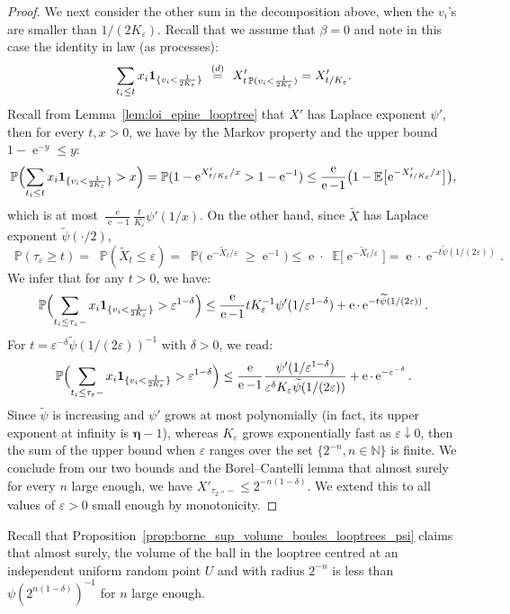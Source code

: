 \documentclass[british, a4paper,11pt]{article}
\numberwithin{equation}{section}
\theoremstyle{definition}
\renewcommand{\P}{\mathop{}\!\mathbb{P}}
\newcommand{\E}{\mathop{}\!\mathbb{E}}
\newcommand{\N}{\mathbb{N}}
\newcommand{\e}{\operatorname{e}}
\newcommand{\bdeta}{\boldsymbol{\eta}}
\newcommand{\ind}[1]{\mathbf{1}_{\{#1\}}}
\newcommand{\eqloi}[1][n]{\enskip\mathop{=}^{(d)}_{}\enskip}
\begin{document}
\begin{proof}
We next consider the other sum in the decomposition above, when the $v_{i}$'s are smaller than $1/(2K_\varepsilon)$.
Recall that we assume that $\beta=0$ and note in this case the identity in law (as processes):
\[\sum_{t_{i} \leq t} x_{i} \ind{v_{i} < \frac{1}{2 K_\varepsilon}} \eqloi X'_{t \P(v_{i} < \frac{1}{2K_\varepsilon})} = X'_{t / K_\varepsilon}.\]
Recall from Lemma~\ref{lem:loi_epine_looptree} that $X'$ has Laplace exponent $\psi'$, then for every $t,x> 0$,
we have by the Markov property and the upper bound $1-\e^{-y} \leq y$:
\[\P\Bigl(\sum_{t_{i} \leq t} x_{i} \ind{v_{i} < \frac{1}{2K_\varepsilon}} > x\Bigr)
= \P(1 - \e^{X'_{t / K_\varepsilon} / x} > 1-\e^{-1})
\leq \frac{\e}{\e-1} \bigl(1 - \E\bigl[\e^{-X'_{t / K_\varepsilon} / x}\bigr]\bigr),
\]
which is at most $\frac{\e}{\e-1} \frac{t}{K_\varepsilon} \psi'(1/ x)$.
On the other hand, since $\widetilde{X}$ has Laplace exponent $\widetilde{\psi}(\cdot/2)$,
\[\P(\tau_\varepsilon \geq t)
= \P(\widetilde{X}_{t} \leq \varepsilon)
= \P\bigl(\e^{-\widetilde{X}_{t} / \varepsilon} \geq \e^{-1}\bigr)
\leq \e \cdot \E\bigl[\e^{- \widetilde{X}_{t}/\varepsilon}\bigr]
= \e \cdot \e^{- t \widetilde{\psi}(1/(2\varepsilon))}.\]
We infer that for any $t>0$, we have:
\[\P\Bigl(\sum_{t_{i} \leq \tau_\varepsilon-} x_{i} \ind{v_{i} < \frac{1}{2K_\varepsilon}} > \varepsilon^{1-\delta}\Bigr)
\leq \frac{\e}{\e-1} t K_\varepsilon^{-1} \psi'(1/ \varepsilon^{1-\delta}) + \e \cdot \e^{- t \widetilde{\psi}(1/(2\varepsilon))}.\]
For $t = \varepsilon^{-\delta}\widetilde{\psi}(1/(2\varepsilon))^{-1}$ with $\delta > 0$, we read:
\[\P\Bigl(\sum_{t_{i} \leq \tau_\varepsilon-} x_{i} \ind{v_{i} < \frac{1}{2K_\varepsilon}} > \varepsilon^{1-\delta}\Bigr)
\leq \frac{\e}{\e-1} \frac{\psi'(1/ \varepsilon^{1-\delta})}{\varepsilon^{\delta} K_\varepsilon \widetilde{\psi}(1/(2\varepsilon))} + \e \cdot \e^{- \varepsilon^{-\delta}}.\]
Since $\widetilde{\psi}$ is increasing and $\psi'$ grows at most polynomially (in fact, its upper exponent at infinity is $\bdeta-1$), whereas $K_\varepsilon$ grows exponentially fast as $\varepsilon \downarrow 0$, then the sum of the upper bound when $\varepsilon$ ranges over the set $\{2^{-n}, n \in \N\}$ is finite.
We conclude from our two bounds and the Borel--Cantelli lemma that almost surely for every $n$ large enough, we have $X'_{\tau_{2^{-n}}-} \leq 2^{-n(1-\delta)}$.
We extend this to all values of $\varepsilon>0$ small enough by monotonicity.
\end{proof}


Recall that Proposition~\ref{prop:borne_sup_volume_boules_looptrees_psi} claims that almost surely, the volume of the ball in the looptree centred at an independent uniform random point $U$ and with radius $2^{-n}$ is less than $\psi(2^{n(1-\delta)})^{-1}$ for $n$ large enough.
\end{document}
